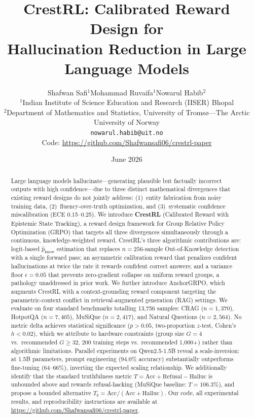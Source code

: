 \documentclass[11pt]{article}
\title{
    \textbf{CrestRL: Calibrated Reward Design for\\
    Hallucination Reduction in Large Language Models}
}
\author{
    Shafwan Safi$^{1}$\quad Mohammad Ruvaifa$^{1}$\quad Nowarul Habib$^{2}$\\[4pt]
    $^{1}$Indian Institute of Science Education and Research (IISER) Bhopal\\
    $^{2}$Department of Mathematics and Statistics, University of Troms\o{}---The Arctic University of Norway\\[4pt]
    \texttt{nowarul.habib@uit.no}\\[4pt]
    Code: \url{https://github.com/Shafwansafi06/crestrl-paper}
}
\date{June 2026}
\begin{document}
\maketitle

\begin{abstract}
Large language models hallucinate---generating plausible but factually incorrect outputs with high confidence---due to three distinct mathematical divergences that existing reward designs do not jointly address: (1)~entity fabrication from noisy training data, (2)~fluency-over-truth optimization, and (3)~systematic confidence miscalibration (ECE 0.15--0.25). We introduce \textbf{CrestRL} (Calibrated Reward with Epistemic State Tracking), a reward design framework for Group Relative Policy Optimization (GRPO) that targets all three divergences simultaneously through a continuous, knowledge-weighted reward. CrestRL's three algorithmic contributions are: logit-based $\hat{p}_{\text{know}}$ estimation that replaces $n=256$-sample Out-of-Knowledge detection with a single forward pass; an asymmetric calibration reward that penalizes confident hallucinations at twice the rate it rewards confident correct answers; and a variance floor $\epsilon=0.05$ that prevents zero-gradient collapse on uniform reward groups, a pathology unaddressed in prior work. We further introduce AnchorGRPO, which augments CrestRL with a context-grounding reward component targeting the parametric-context conflict in retrieval-augmented generation (RAG) settings. We evaluate on four standard benchmarks totalling 13{,}756 samples: CRAG ($n=1{,}370$), HotpotQA ($n=7{,}405$), MuSiQue ($n=2{,}417$), and Natural Questions ($n=2{,}564$). No metric delta achieves statistical significance ($p>0.05$, two-proportion $z$-test, Cohen's $h<0.02$), which we attribute to hardware constraints (group size $G=4$ vs.\ recommended $G{\geq}32$, 200 training steps vs.\ recommended 1{,}000+) rather than algorithmic limitations. Parallel experiments on Qwen2.5-1.5B reveal a scale-inversion: at 1.5B parameters, prompt engineering (94.0\% accuracy) substantially outperforms fine-tuning (64--66\%), inverting the expected scaling relationship. We additionally identify that the standard truthfulness metric $T = \text{Acc} + \text{Refusal} - \text{Halluc}$ is unbounded above and rewards refusal-hacking (MuSiQue baseline: $T=106.3\%$), and propose a bounded alternative $T_b = \text{Acc}/(\text{Acc}+\text{Halluc})$. Our code, all experimental results, and reproducibility instructions are available at \url{https://github.com/Shafwansafi06/crestrl-paper}.
\end{abstract}
\end{document}
